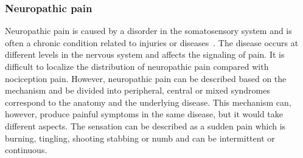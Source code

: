 

\subsubsection{Neuropathic pain}
Neuropathic pain is caused by a disorder in the somatosensory system and is often a chronic condition related to injuries or diseases~\cite{Mindruta2013}. The disease occurs at different levels in the nervous system and affects the signaling of pain. It is difficult to localize the distribution of neuropathic pain compared with nociception pain. However, neuropathic pain can be described based on the mechanism and be divided into peripheral, central or mixed syndromes correspond to the anatomy and the underlying disease. This mechanism can, however, produce painful symptoms in the same disease, but it would take different aspects. The sensation can be described as a sudden pain which is burning, tingling, shooting stabbing or numb and can be intermittent or continuous. \cite{Mindruta2013}


